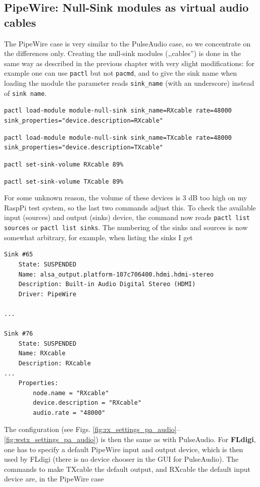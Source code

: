 \documentclass[12pt]{book}
\begin{document}
\subsection[PipeWire: NullSink modules]{PipeWire: Null-Sink modules as virtual audio cables}
The PipeWire case is very similar to the PulseAudio case, so we concentrate
on the differences only. Creating the null-sink modules (,,cables'') is
done in the same way as described in the previous chapter with very slight modifications:
for example one can use \texttt{pactl} but not \texttt{pacmd}, and to give the sink name
when loading the module the parameter reads \texttt{sink\_name} (with an underscore)
instead of \texttt{sink name}.

\texttt{pactl load-module module-null-sink sink\_name=RXcable rate=48000 \\
sink\_properties="device.description=RXcable"
}

\texttt{pactl load-module module-null-sink sink\_name=TXcable rate=48000 \\
sink\_properties="device.description=TXcable"
}

\texttt{pactl set-sink-volume RXcable 89\%}

\texttt{pactl set-sink-volume TXcable 89\%}

For some unknown reason, the volume of these devices is 3 dB too high on my
RaspPi test system, so the last two commands adjust this.
To check the available input (sources) and output (sinks) device, the command
now reads \texttt{pactl list sources} or \texttt{pactl list sinks}. The numbering
of the sinks and sources is now somewhat arbitrary, for example, when listing the
sinks I get
\begin{verbatim}
Sink #65
	State: SUSPENDED
	Name: alsa_output.platform-107c706400.hdmi.hdmi-stereo
	Description: Built-in Audio Digital Stereo (HDMI)
	Driver: PipeWire

...

Sink #76
	State: SUSPENDED
	Name: RXcable
	Description: RXcable
...
	Properties:
		node.name = "RXcable"
		device.description = "RXcable"
		audio.rate = "48000"
\end{verbatim}
The configuration (see Figs. \ref{fig:rx_settings_pa_audio}--\ref{fig:wstx_settings_pa_audio}) is then the same
as with PulseAudio. For {\color{red} \textbf{FLdigi}}, one has to specify a default PipeWire input and output device, which is
then used by FLdigi (there is no device chooser in the GUI for PulseAudio). The commands to make TXcable the default output, and RXcable the default
input device are, in the PipeWire case
\end{document}
